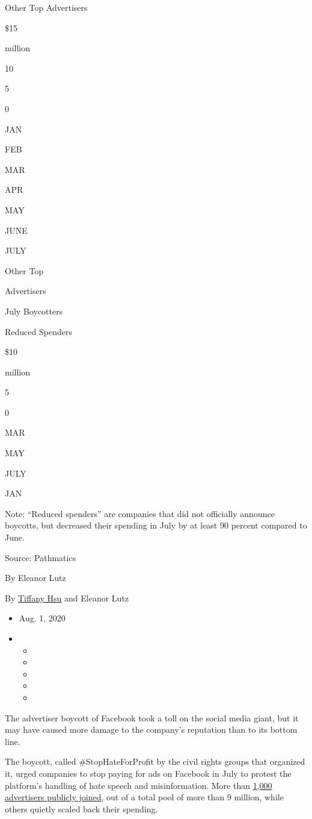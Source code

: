 Other Top Advertisers

\$15

million

10

5

0

JAN

FEB

MAR

APR

MAY

JUNE

JULY

Other Top

Advertisers

July Boycotters

Reduced Spenders

\$10

million

5

0

MAR

MAY

JULY

JAN

Note: ``Reduced spenders'' are companies that did not officially
announce boycotts, but decreased their spending in July by at least 90
percent compared to June.

Source: Pathmatics

By Eleanor Lutz

By \href{https://www.nytimes3xbfgragh.onion/by/tiffany-hsu}{Tiffany Hsu}
and Eleanor Lutz

\begin{itemize}
\item
  Aug. 1, 2020
\item
  \begin{itemize}
  \item
  \item
  \item
  \item
  \item
  \end{itemize}
\end{itemize}

The advertiser boycott of Facebook took a toll on the social media
giant, but it may have caused more damage to the company's reputation
than to its bottom line.

The boycott, called \#StopHateForProfit by the civil rights groups that
organized it, urged companies to stop paying for ads on Facebook in July
to protest the platform's handling of hate speech and misinformation.
More than
\href{https://www.nytimes3xbfgragh.onion/2020/06/26/business/media/Facebook-advertising-boycott.html}{1,000
advertisers publicly joined}, out of a total pool of more than 9
million, while others quietly scaled back their spending.

